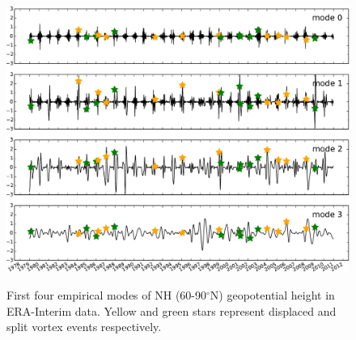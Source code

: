 \begin{figure}[t]
  \centering
  \noindent\includegraphics[width=\textwidth,angle=0]{figures/chapter-conclusions/EMD.pdf}\\
  \caption[EMD timeseries]{First four empirical modes of NH (60-90$^{\circ}$N)
    geopotential height in ERA-Interim data. Yellow and green stars represent
    displaced and split vortex events respectively.}\label{fig:emd}
\end{figure}





